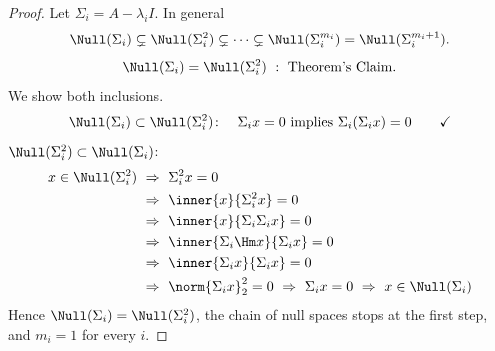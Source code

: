 \begin{proof}[Proof]
Let $\Sigma_i=A-\lambda_iI$. In general
\[
\Null(\Sigma_i)\subsetneq\Null(\Sigma_i^2)\subsetneq\cdots\subsetneq\Null(\Sigma_i^{m_i})=\Null(\Sigma_i^{m_i+1}).
\]
\[
\Null(\Sigma_i)=\Null(\Sigma_i^2)\ :\ \text{Theorem's Claim.}
\]
We show both inclusions.
\[
\Null(\Sigma_i)\subset\Null(\Sigma_i^2)\colon\quad \Sigma_ix=0\ \text{implies}\ \Sigma_i(\Sigma_ix)=0 \qquad\checkmark
\]
$\Null(\Sigma_i^2)\subset\Null(\Sigma_i)$:
\begin{align*}
x\in\Null(\Sigma_i^2)\ &\Rightarrow\ \Sigma_i^2x=0\\
&\Rightarrow\ \inner{x}{\Sigma_i^2x}=0\\
&\Rightarrow\ \inner{x}{\Sigma_i\Sigma_ix}=0\\
&\Rightarrow\ \inner{\Sigma_i\Hm x}{\Sigma_ix}=0\\
&\Rightarrow\ \inner{\Sigma_ix}{\Sigma_ix}=0\\
&\Rightarrow\ \norm{\Sigma_ix}_2^2=0\ \Rightarrow\ \Sigma_ix=0\ \Rightarrow\ x\in\Null(\Sigma_i)
\end{align*}
Hence $\Null(\Sigma_i)=\Null(\Sigma_i^2)$, the chain of null spaces stops at the first step, and $m_i=1$ for every $i$.
\end{proof}


